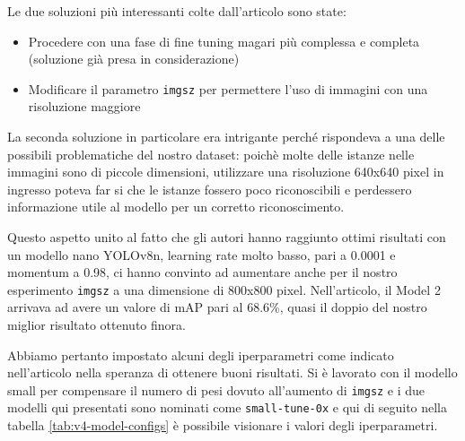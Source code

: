 Le due soluzioni più interessanti colte dall'articolo sono state: 
\begin{itemize}
    \item Procedere con una fase di fine tuning magari più complessa e completa (soluzione già presa in 
    considerazione)
    \item Modificare il parametro \texttt{imgsz} per permettere l'uso di immagini con una risoluzione maggiore
\end{itemize}

La seconda soluzione in particolare era intrigante perché rispondeva a una delle possibili problematiche del nostro
dataset: poichè molte delle istanze nelle immagini sono di piccole dimensioni, utilizzare una risoluzione 640x640
pixel in ingresso poteva far si che le istanze fossero poco riconoscibili e perdessero informazione utile
al modello per un corretto riconoscimento. 

Questo aspetto unito al fatto che gli autori hanno raggiunto ottimi risultati con un modello nano YOLOv8n,
learning rate molto basso, pari a 0.0001 e momentum a 0.98, ci hanno convinto ad aumentare anche per il nostro
esperimento \texttt{imgsz} a una dimensione di 800x800 pixel. Nell'articolo, il Model 2 arrivava ad avere un valore
di mAP pari al 68.6\%, quasi il doppio del nostro miglior risultato ottenuto finora.

Abbiamo pertanto impostato alcuni degli iperparametri come indicato nell'articolo nella speranza di ottenere 
buoni risultati. Si è lavorato con il modello small per compensare il numero di pesi dovuto all'aumento di \texttt{imgsz}
e i due modelli qui presentati sono nominati come \texttt{small-tune-0x} e qui di seguito nella tabella
\ref{tab:v4-model-configs} è possibile visionare i valori degli iperparametri.

